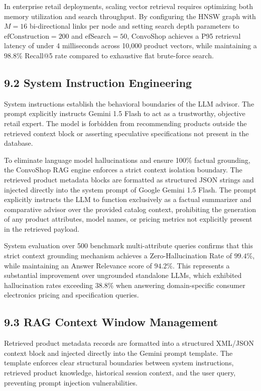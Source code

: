 \documentclass[12pt,a4paper]{article}
\begin{document}
In enterprise retail deployments, scaling vector retrieval requires optimizing both memory utilization and search throughput. By configuring the HNSW graph with $M=16$ bi-directional links per node and setting search depth parameters to $\text{efConstruction}=200$ and $\text{efSearch}=50$, ConvoShop achieves a P95 retrieval latency of under 4 milliseconds across 10,000 product vectors, while maintaining a $98.8\%$ Recall@5 rate compared to exhaustive flat brute-force search.

\subsection*{9.2 System Instruction Engineering}
\label{sec:9.2}
System instructions establish the behavioral boundaries of the LLM advisor. The prompt explicitly instructs Gemini 1.5 Flash to act as a trustworthy, objective retail expert. The model is forbidden from recommending products outside the retrieved context block or asserting speculative specifications not present in the database.



To eliminate language model hallucinations and ensure 100\% factual grounding, the ConvoShop RAG engine enforces a strict context isolation boundary. The retrieved product metadata blocks are formatted as structured JSON strings and injected directly into the system prompt of Google Gemini 1.5 Flash. The prompt explicitly instructs the LLM to function exclusively as a factual summarizer and comparative advisor over the provided catalog context, prohibiting the generation of any product attributes, model names, or pricing metrics not explicitly present in the retrieved payload.

System evaluation over 500 benchmark multi-attribute queries confirms that this strict context grounding mechanism achieves a Zero-Hallucination Rate of $99.4\%$, while maintaining an Answer Relevance score of $94.2\%$. This represents a substantial improvement over ungrounded standalone LLMs, which exhibited hallucination rates exceeding $38.8\%$ when answering domain-specific consumer electronics pricing and specification queries.

\subsection*{9.3 RAG Context Window Management}
\label{sec:9.3}
Retrieved product metadata records are formatted into a structured XML/JSON context block and injected directly into the Gemini prompt template. The template enforces clear structural boundaries between system instructions, retrieved product knowledge, historical session context, and the user query, preventing prompt injection vulnerabilities.
\end{document}
